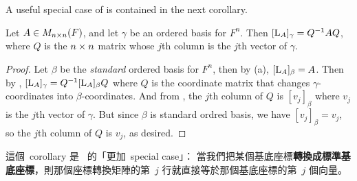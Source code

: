 A useful special case of  is contained in the next corollary.

\begin{corollary} \label{corollary 2.23.1}
Let \(A \in M_{n \times n}(F)\), and let \(\gamma\) be an ordered basis for \(F^n\).
Then \([\mathrm{L}_A]_{\gamma} = Q^{-1} A Q\), where \(Q\) is the \(n \times n\) matrix whose \(j\)th column is the \(j\)th vector of \(\gamma\).
\end{corollary}

\begin{proof}
Let \(\beta\) be the \emph{standard} ordered basis for \(F^n\), then by (a), \([\mathrm{L}_A]_{\beta} = A\).
Then by , \([\mathrm{L}_A]_{\gamma} = Q^{-1} [\mathrm{L}_A]_{\beta} Q\) where \(Q\) is the coordinate matrix that changes \(\gamma\)-coordinates into \(\beta\)-coordinates.
And from , the \(j\)th column of \(Q\) is \([v_j]_{\beta}\) where \(v_j\) is the \(j\)th vector of \(\gamma\).
But since \(\beta\) is standard ordred basis, we have \([v_j]_{\beta} = v_j\), so the \(j\)th column of \(Q\) is \(v_j\), as desired.
\end{proof}

\begin{note}
這個\ corollary 是\  的「更加\ special case」：
當我們把某個基底座標\textbf{轉換成標準基底座標}，則那個座標轉換矩陣的第\ \(j\) 行就直接等於那個基底座標的第\ \(j\) 個向量。
\end{note}

